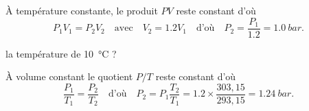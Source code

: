 
\begin{corrige}
À température constante, le produit $PV$ reste constant d'où 
\[
P_{1}V_{1}=P_{2}V_{2}
\quad\text{avec}\quad
V_2=\num{1,2}V_1
\quad\text{d'où}\quad
P_{2}=\frac{P_1}{\num{1,2}}
=\SI{1.0}{bar}.
\]
\end{corrige}



\begin{enonce}
la température de \SI{10}{\celsius} ?
\end{enonce}


\begin{corrige}
À volume constant le quotient $P/T$ reste constant d'où
\[
\frac{P_1}{T_1}=\frac{P_2}{T_2}
\quad\text{d'où}\quad
P_{2}=P_1\frac{T_2}{T_1}=\num{1,2}\times\frac{303,15}{293,15}=\SI{1.24}{bar}.
\]
\end{corrige}


\finEntrainement








\hauteurLargeurCadreReponse		{7mm}{25mm}
\typeEntrainement				{} %
\initialisationEntrainement


